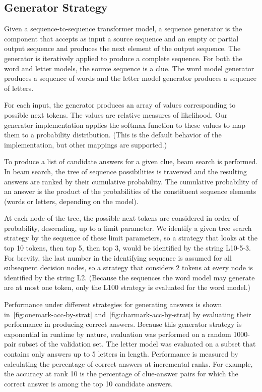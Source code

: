 \documentclass[letterpaper]{article} %
\begin{document}
\begin{NoHyper}
\section{Generator Strategy}
\label{sec:generator}

Given a sequence-to-sequence transformer model, a sequence generator is the component that accepts as input a source sequence and an empty or partial output sequence and produces the next element of the output sequence. The generator is iteratively applied to produce a complete sequence. For both the word and letter models, the source sequence is a clue. The word model generator produces a sequence of words and the letter model generator produces a sequence of letters.

For each input, the generator produces an array of values corresponding to possible next tokens. The values are relative measures of likelihood. Our generator implementation applies the softmax function to these values to map them to a probability distribution. (This is the default behavior of the implementation, but other mappings are supported.)

To produce a list of candidate answers for a given clue, beam search is performed. In beam search, the tree of sequence possibilities is traversed and the resulting answers are ranked by their cumulative probability. The cumulative probability of an answer is the product of the probabilities of the constituent sequence elements (words or letters, depending on the model).

At each node of the tree, the possible next tokens are considered in order of probability, descending, up to a limit parameter.
We identify a given tree search strategy by the sequence of these limit parameters, so a strategy that looks at the top 10 tokens, then top 5, then top 3, would be identified by the string L10-5-3.
For brevity, the last number in the identifying sequence is assumed for all subsequent decision nodes, so a strategy that considers 2 tokens at every node is identified by the string L2. (Because the sequences the word model may generate are at most one token, only the L100 strategy is evaluated for the word model.)

Performance under different strategies for generating answers is shown in~\autoref{fig:onemark-acc-by-strat} and~\autoref{fig:charmark-acc-by-strat} by evaluating their performance in producing correct answers.
Because this generator strategy is exponential in runtime by nature, evaluation was performed on a random 1000-pair subset of the validation set.
The letter model was evaluated on a subset that contains only answers up to 5 letters in length.
Performance is measured by calculating the percentage of correct answers at incremental ranks.
For example, the accuracy at rank 10 is the percentage of clue-answer pairs for which the correct answer is among the top 10 candidate answers.


\end{NoHyper}
\end{document}
